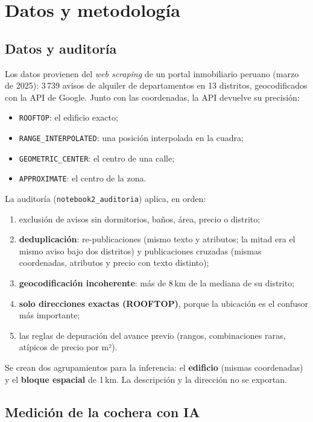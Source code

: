 \chapter{Datos y metodología}\label{cap:datos}

\section{Datos y auditoría}\label{sec:auditoria}

Los datos provienen del \textit{web scraping} de un portal inmobiliario peruano (marzo de 2025): 3\,739 avisos de alquiler de departamentos en 13 distritos, geocodificados con la API de Google. Junto con las coordenadas, la API devuelve su precisión:
\begin{itemize}[itemsep=0pt]
\item \texttt{ROOFTOP}: el edificio exacto;
\item \texttt{RANGE\_INTERPOLATED}: una posición interpolada en la cuadra;
\item \texttt{GEOMETRIC\_CENTER}: el centro de una calle;
\item \texttt{APPROXIMATE}: el centro de la zona.
\end{itemize}
La auditoría (\texttt{notebook2\_auditoria}) aplica, en orden:
\begin{enumerate}[leftmargin=*,itemsep=1pt]
\item exclusión de avisos sin dormitorios, baños, área, precio o distrito;
\item \textbf{deduplicación}: re-publicaciones (mismo texto y atributos; la mitad era el mismo aviso bajo dos distritos) y publicaciones cruzadas (mismas coordenadas, atributos y precio con texto distinto);
\item \textbf{geocodificación incoherente}: más de 8\,km de la mediana de su distrito;
\item \textbf{solo direcciones exactas (ROOFTOP)}, porque la ubicación es el confusor más importante;
\item las reglas de depuración del avance previo (rangos, combinaciones raras, atípicos de precio por m²).
\end{enumerate}
Se crean dos agrupamientos para la inferencia: el \textbf{edificio} (mismas coordenadas) y el \textbf{bloque espacial} de 1\,km. La descripción y la dirección no se exportan.

\section{Medición de la cochera con IA}\label{sec:oe5}

